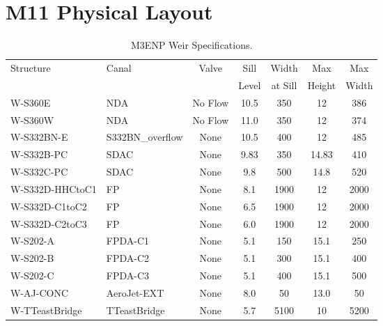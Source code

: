 \section{M11 Physical Layout}

\begin{table}[!h]
\caption{M3ENP Weir Specifications.}
\label{tab:weirs}
\begin{tabular}{llccccc}
\hline
Structure         & Canal            & Valve     & Sill    & Width   & Max   & Max   \\
                  &                  &           & Level   & at Sill & Height& Width \\
\hline
W-S360E           & NDA              & No Flow   &  10.5   & 350     & 12    & 386   \\
W-S360W           & NDA              & No Flow   &  11.0   & 350     & 12    & 374   \\
W-S332BN-E        & S332BN\_overflow & None      &  10.5   & 400     & 12    & 485   \\
W-S332B-PC        & SDAC             & None      &  9.83   & 350     & 14.83 & 410   \\
W-S332C-PC        & SDAC             & None      &  9.8    & 500     & 14.8  & 520   \\
W-S332D-HHCtoC1   & FP               & None      &  8.1    & 1900    & 12    & 2000  \\
W-S332D-C1toC2    & FP               & None      &  6.5    & 1900    & 12    & 2000  \\
W-S332D-C2toC3    & FP               & None      &  6.0    & 1900    & 12    & 2000  \\
W-S202-A          & FPDA-C1          & None      &  5.1    & 150     & 15.1  & 250   \\
W-S202-B          & FPDA-C2          & None      &  5.1    & 300     & 15.1  & 400   \\
W-S202-C          & FPDA-C3          & None      &  5.1    & 400     & 15.1  & 500   \\
W-AJ-CONC         & AeroJet-EXT      & None      &  8.0    & 50      & 13.0  & 50    \\
W-TTeastBridge    & TTeastBridge     & None      &  5.7    & 5100    & 10    & 5200  \\

\end{tabular}
\end{table}
